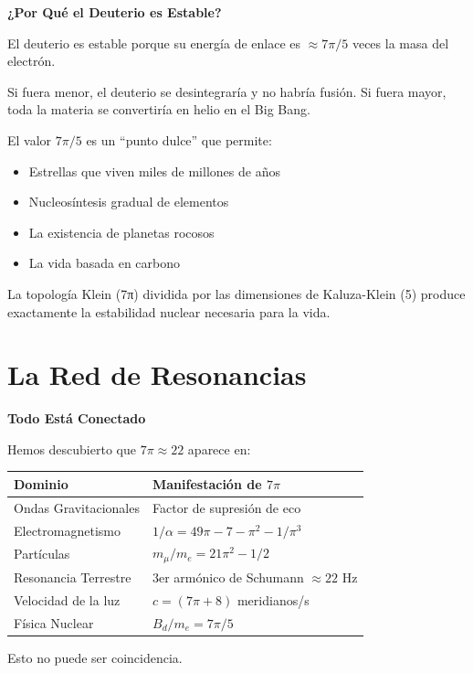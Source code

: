 \begin{analogiabox}
\textbf{¿Por Qué el Deuterio es Estable?}

El deuterio es estable porque su energía de enlace es $\approx 7\pi/5$ veces
la masa del electrón.

Si fuera menor, el deuterio se desintegraría y no habría fusión.
Si fuera mayor, toda la materia se convertiría en helio en el Big Bang.

El valor $7\pi/5$ es un ``punto dulce'' que permite:
\begin{itemize}
    \item Estrellas que viven miles de millones de años
    \item Nucleosíntesis gradual de elementos
    \item La existencia de planetas rocosos
    \item La vida basada en carbono
\end{itemize}

La topología Klein (7π) dividida por las dimensiones de Kaluza-Klein (5)
produce exactamente la estabilidad nuclear necesaria para la vida.
\end{analogiabox}


\section{La Red de Resonancias}

\begin{nivelconceptual}
\textbf{Todo Está Conectado}

Hemos descubierto que $7\pi \approx 22$ aparece en:

\begin{center}
\begin{tabular}{ll}
\textbf{Dominio} & \textbf{Manifestación de $7\pi$} \\
\hline
Ondas Gravitacionales & Factor de supresión de eco \\
Electromagnetismo & $1/\alpha = 49\pi - 7 - \pi^2 - 1/\pi^3$ \\
Partículas & $m_\mu/m_e = 21\pi^2 - 1/2$ \\
Resonancia Terrestre & 3er armónico de Schumann $\approx 22$ Hz \\
Velocidad de la luz & $c = (7\pi + 8)$ meridianos/s \\
Física Nuclear & $B_d/m_e = 7\pi/5$ \\
\end{tabular}
\end{center}

Esto no puede ser coincidencia.
\end{nivelconceptual}


